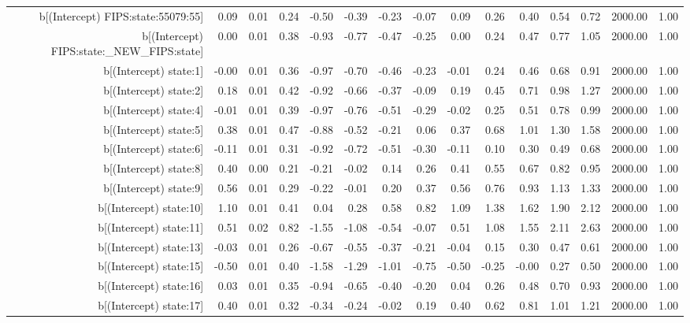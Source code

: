 \begin{table}[ht]
\begin{tabular}{rrrrrrrrrrrrrrr}
  b[(Intercept) FIPS:state:55079:55] & 0.09 & 0.01 & 0.24 & -0.50 & -0.39 & -0.23 & -0.07 & 0.09 & 0.26 & 0.40 & 0.54 & 0.72 & 2000.00 & 1.00 \\ 
  b[(Intercept) FIPS:state:\_NEW\_FIPS:state] & 0.00 & 0.01 & 0.38 & -0.93 & -0.77 & -0.47 & -0.25 & 0.00 & 0.24 & 0.47 & 0.77 & 1.05 & 2000.00 & 1.00 \\ 
  b[(Intercept) state:1] & -0.00 & 0.01 & 0.36 & -0.97 & -0.70 & -0.46 & -0.23 & -0.01 & 0.24 & 0.46 & 0.68 & 0.91 & 2000.00 & 1.00 \\ 
  b[(Intercept) state:2] & 0.18 & 0.01 & 0.42 & -0.92 & -0.66 & -0.37 & -0.09 & 0.19 & 0.45 & 0.71 & 0.98 & 1.27 & 2000.00 & 1.00 \\ 
  b[(Intercept) state:4] & -0.01 & 0.01 & 0.39 & -0.97 & -0.76 & -0.51 & -0.29 & -0.02 & 0.25 & 0.51 & 0.78 & 0.99 & 2000.00 & 1.00 \\ 
  b[(Intercept) state:5] & 0.38 & 0.01 & 0.47 & -0.88 & -0.52 & -0.21 & 0.06 & 0.37 & 0.68 & 1.01 & 1.30 & 1.58 & 2000.00 & 1.00 \\ 
  b[(Intercept) state:6] & -0.11 & 0.01 & 0.31 & -0.92 & -0.72 & -0.51 & -0.30 & -0.11 & 0.10 & 0.30 & 0.49 & 0.68 & 2000.00 & 1.00 \\ 
  b[(Intercept) state:8] & 0.40 & 0.00 & 0.21 & -0.21 & -0.02 & 0.14 & 0.26 & 0.41 & 0.55 & 0.67 & 0.82 & 0.95 & 2000.00 & 1.00 \\ 
  b[(Intercept) state:9] & 0.56 & 0.01 & 0.29 & -0.22 & -0.01 & 0.20 & 0.37 & 0.56 & 0.76 & 0.93 & 1.13 & 1.33 & 2000.00 & 1.00 \\ 
  b[(Intercept) state:10] & 1.10 & 0.01 & 0.41 & 0.04 & 0.28 & 0.58 & 0.82 & 1.09 & 1.38 & 1.62 & 1.90 & 2.12 & 2000.00 & 1.00 \\ 
  b[(Intercept) state:11] & 0.51 & 0.02 & 0.82 & -1.55 & -1.08 & -0.54 & -0.07 & 0.51 & 1.08 & 1.55 & 2.11 & 2.63 & 2000.00 & 1.00 \\ 
  b[(Intercept) state:13] & -0.03 & 0.01 & 0.26 & -0.67 & -0.55 & -0.37 & -0.21 & -0.04 & 0.15 & 0.30 & 0.47 & 0.61 & 2000.00 & 1.00 \\ 
  b[(Intercept) state:15] & -0.50 & 0.01 & 0.40 & -1.58 & -1.29 & -1.01 & -0.75 & -0.50 & -0.25 & -0.00 & 0.27 & 0.50 & 2000.00 & 1.00 \\ 
  b[(Intercept) state:16] & 0.03 & 0.01 & 0.35 & -0.94 & -0.65 & -0.40 & -0.20 & 0.04 & 0.26 & 0.48 & 0.70 & 0.93 & 2000.00 & 1.00 \\ 
  b[(Intercept) state:17] & 0.40 & 0.01 & 0.32 & -0.34 & -0.24 & -0.02 & 0.19 & 0.40 & 0.62 & 0.81 & 1.01 & 1.21 & 2000.00 & 1.00 \\ 

\end{tabular}
\end{table}
